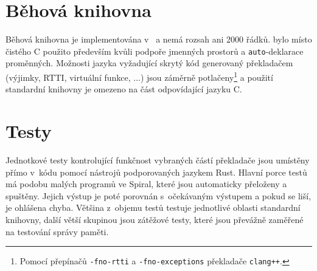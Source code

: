 \section{Běhová knihovna}

Běhová knihovna je implementována v~\Cplusplus{} a nemá rozsah ani 2000 řádků.
\Cplusplus{} bylo místo čistého C použito především kvůli podpoře jmenných
prostorů a \texttt{auto}-deklarace proměnných. Možnosti jazyka vyžadující skrytý
kód generovaný překladačem (výjimky, RTTI, virtuální funkce, ...) jsou záměrně
potlačeny\footnote{Pomocí přepínačů \texttt{-fno-rtti} a
\texttt{-fno-exceptions} překladače \texttt{clang++}.} a použití standardní
knihovny je omezeno na část odpovídající jazyku C.

\section{Testy}

Jednotkové testy kontrolující funkčnost vybraných částí překladače jsou umístěny
přímo v~kódu pomocí nástrojů podporovaných jazykem Rust. Hlavní porce testů má
podobu malých programů ve Spiral, které jsou automaticky přeloženy a spuštěny.
Jejich výstup je poté porovnán s~očekávaným výstupem a pokud se liší, je
ohlášena chyba. Většina z~objemu testů testuje jednotlivé oblasti standardní
knihovny, další větší skupinou jsou zátěžové testy, které jsou převážně zaměřené
na testování správy paměti.

